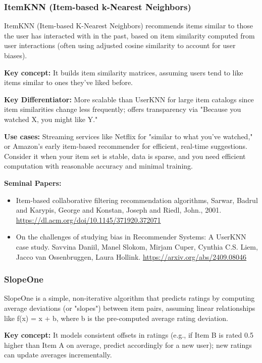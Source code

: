 \documentclass{article}
\begin{document}
    \subsubsection{ItemKNN (Item-based k-Nearest Neighbors)}
    ItemKNN (Item-based K-Nearest Neighbors) recommends items similar to those the user has interacted with in the past, based on item similarity computed from user interactions (often using adjusted cosine similarity to account for user biases). 

\noindent\textbf{Key concept:} It builds item similarity matrices, assuming users tend to like items similar to ones they've liked before. 

\noindent\textbf{Key Differentiator:} More scalable than UserKNN for large item catalogs since item similarities change less frequently; offers transparency via "Because you watched X, you might like Y." 

\noindent\textbf{Use cases:} Streaming services like Netflix for "similar to what you've watched," or Amazon's early item-based recommender for efficient, real-time suggestions. Consider it when your item set is stable, data is sparse, and you need efficient computation with reasonable accuracy and minimal training.

\noindent\textbf{Seminal Papers:}
    \begin{itemize}
        \item Item-based collaborative filtering recommendation algorithms, Sarwar, Badrul and Karypis, George and Konstan, Joseph and Riedl, John., 2001. \url{https://dl.acm.org/doi/10.1145/371920.372071}
        \item On the challenges of studying bias in Recommender Systems: A UserKNN case study. Savvina Daniil, Manel Slokom, Mirjam Cuper, Cynthia C.S. Liem, Jacco van Ossenbruggen, Laura Hollink. \url{https://arxiv.org/abs/2409.08046}
    \end{itemize}


    \subsubsection{SlopeOne}
    SlopeOne is a simple, non-iterative algorithm that predicts ratings by computing average deviations (or "slopes") between item pairs, assuming linear relationships like f(x) = x + b, where b is the pre-computed average rating deviation. 

\noindent\textbf{Key concept:} It models consistent offsets in ratings (e.g., if Item B is rated 0.5 higher than Item A on average, predict accordingly for a new user); new ratings can update averages incrementally. 
\end{document}
